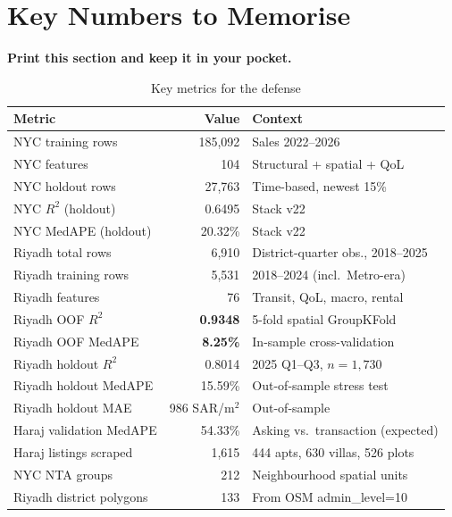 \documentclass[11pt, a4paper, twoside]{article}
\begin{document}
\section{Key Numbers to Memorise}
\label{sec:numbers}

\noindent\textbf{Print this section and keep it in your pocket.}

\begin{table}[H]
  \centering
  \caption{Key metrics for the defense}
  \label{tab:key_numbers}
  \begin{tabular}{lrl}
    \toprule
    Metric & Value & Context \\
    \midrule
    NYC training rows       & 185,092    & Sales 2022--2026 \\
    NYC features            & 104        & Structural + spatial + QoL \\
    NYC holdout rows        & 27,763     & Time-based, newest 15\% \\
    NYC $R^2$ (holdout)     & 0.6495     & Stack v22 \\
    NYC MedAPE (holdout)    & 20.32\%    & Stack v22 \\
    \midrule
    Riyadh total rows       & 6,910      & District-quarter obs., 2018--2025 \\
    Riyadh training rows    & 5,531      & 2018--2024 (incl.\ Metro-era) \\
    Riyadh features         & 76         & Transit, QoL, macro, rental \\
    Riyadh OOF $R^2$        & \textbf{0.9348} & 5-fold spatial GroupKFold \\
    Riyadh OOF MedAPE       & \textbf{8.25\%} & In-sample cross-validation \\
    Riyadh holdout $R^2$    & 0.8014     & 2025 Q1--Q3, $n=1{,}730$ \\
    Riyadh holdout MedAPE   & 15.59\%    & Out-of-sample stress test \\
    Riyadh holdout MAE      & 986 SAR/m$^2$ & Out-of-sample \\
    \midrule
    Haraj validation MedAPE & 54.33\%    & Asking vs.\ transaction (expected) \\
    Haraj listings scraped  & 1,615      & 444 apts, 630 villas, 526 plots \\
    NYC NTA groups          & 212        & Neighbourhood spatial units \\
    Riyadh district polygons& 133        & From OSM admin\_level=10 \\

\end{tabular}
\end{table}
\end{document}
